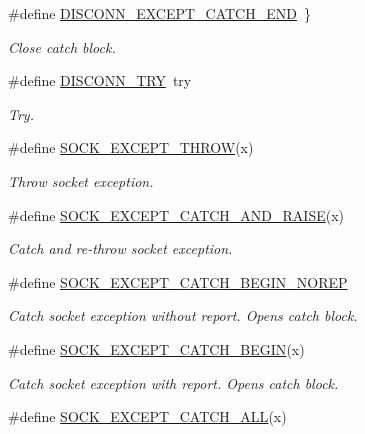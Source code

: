 \begin{DoxyCompactItemize}
\#define \hyperlink{group__EXCEPT__GROUP_ga142715775c6f4ff27e2a88a424a3bbb4}{D\+I\+S\+C\+O\+N\+N\+\_\+\+E\+X\+C\+E\+P\+T\+\_\+\+C\+A\+T\+C\+H\+\_\+\+E\+ND}~\}
\begin{DoxyCompactList}\small\item\em Close catch block. \end{DoxyCompactList}\item 
\#define \hyperlink{group__EXCEPT__GROUP_gac13aeebcd10acdb772f18e65e1c688c1}{D\+I\+S\+C\+O\+N\+N\+\_\+\+T\+RY}~try
\begin{DoxyCompactList}\small\item\em Try. \end{DoxyCompactList}\item 
\#define \hyperlink{group__EXCEPT__GROUP_gadbb8953d6dd2ac97772210eae40d3327}{S\+O\+C\+K\+\_\+\+E\+X\+C\+E\+P\+T\+\_\+\+T\+H\+R\+OW}(x)
\begin{DoxyCompactList}\small\item\em Throw socket exception. \end{DoxyCompactList}\item 
\#define \hyperlink{group__EXCEPT__GROUP_ga9442126bf6f0c00b8bbca31bc2a24c65}{S\+O\+C\+K\+\_\+\+E\+X\+C\+E\+P\+T\+\_\+\+C\+A\+T\+C\+H\+\_\+\+A\+N\+D\+\_\+\+R\+A\+I\+SE}(x)
\begin{DoxyCompactList}\small\item\em Catch and re-\/throw socket exception. \end{DoxyCompactList}\item 
\#define \hyperlink{group__EXCEPT__GROUP_gabe910e28705bb6bc373e394ae8987f2b}{S\+O\+C\+K\+\_\+\+E\+X\+C\+E\+P\+T\+\_\+\+C\+A\+T\+C\+H\+\_\+\+B\+E\+G\+I\+N\+\_\+\+N\+O\+R\+EP}
\begin{DoxyCompactList}\small\item\em Catch socket exception without report. Opens catch block. \end{DoxyCompactList}\item 
\#define \hyperlink{group__EXCEPT__GROUP_ga496fbb199ec54a00171828adb3a454c5}{S\+O\+C\+K\+\_\+\+E\+X\+C\+E\+P\+T\+\_\+\+C\+A\+T\+C\+H\+\_\+\+B\+E\+G\+IN}(x)
\begin{DoxyCompactList}\small\item\em Catch socket exception with report. Opens catch block. \end{DoxyCompactList}\item 
\#define \hyperlink{group__EXCEPT__GROUP_ga873400261bf1fcbe495e3f6d23357476}{S\+O\+C\+K\+\_\+\+E\+X\+C\+E\+P\+T\+\_\+\+C\+A\+T\+C\+H\+\_\+\+A\+LL}(x)

\end{DoxyCompactItemize}
